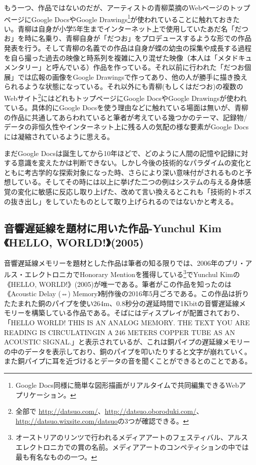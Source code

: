 \documentclass[a4paper,report]{jsbook}
\begin{document}
もう一つ、作品ではないのだが、アーティストの青柳菜摘のWebページのトップページにGoogle
DocsやGoogle Drawings\footnote{Google
  Docs同様に簡単な図形描画がリアルタイムで共同編集できるWebアプリケーション。}が使われていることに触れておきたい。青柳は自身が小学5年生までインターネット上で使用していたあだ名「だつお」を時に名乗り、青柳自身が「だつお」をプロデュースするような形での作品発表を行う。そして青柳の名義での作品は自身が蝶の幼虫の採集や成長する過程を自ら撮った過去の映像と時系列を複雑に入り混ぜた映像（本人は「メタドキュメンタリー」と呼んでいる）作品を作っている\autocite{aoyagi:icc}。それ以前に行われた「だつお個展」では広報の画像をGoogle
Drawingsで作ってあり、他の人が勝手に描き換えられるような状態になっている\autocite{datsuo:koten}。それ以外にも青柳(もしくはだつお)の複数のWebサイト\footnote{全部で
  \url{http://datsuo.com/}、\url{http://datsuo.oboroduki.com/}、\url{http://datsuo.wixsite.com/datsuo}の3つが確認できる。}にはどれもトップページにGoogle
DocsやGoogle Drawingsが使われている。具体的にGoogle
Docsを使う理由などに触れている場面は無いが、青柳の作品に共通してあらわれていると筆者が考えている幾つかのテーマ、記録物/データの非恒久性やインターネット上に残る人の気配の様な要素がGoogle
Docsには凝縮されているように思える。

まだGoogle
Docsは誕生してから10年ほどで、どのように人間の記憶や記録に対する意識を変えたかは判断できない。しかし今後の技術的なパラダイムの変化とともに考古学的な探索対象になった時、さらにより深い意味付がされるものと予想している。そしてその時には以上に挙げた二つの例はシステムの与える身体感覚の変化に敏感に反応し取り上げた、改めて言い換えるとこれも「技術的トポスの抜き出し」をしていたものとして取り上げられるのではないかと考える。

\subsection{音響遅延線を題材に用いた作品-Yunchul Kim《HELLO,
WORLD!》(2005)}\label{ux97f3ux97ffux9045ux5ef6ux7ddaux3092ux984cux6750ux306bux7528ux3044ux305fux4f5cux54c1-yunchul-kimhello-world2005}

音響遅延線メモリーを題材とした作品は筆者の知る限りでは、2006年のプリ・アルス・エレクトロニカでHonorary
Mentionを獲得している\footnote{オーストリアのリンツで行われるメディアアートのフェスティバル、アルスエレクトロニカでの賞の名前。メディアアートのコンペティションの中では最も有名なものの一つ。}でYunchul
Kimの《HELLO,
WORLD!》(2005)が唯一である。筆者がこの作品を知ったのは《Acoustic Delay
(⇔)
Memory》制作後の2016年5月ごろである。この作品は折りたたまれた銅のパイプを使い264m、0.8秒分の遅延時間で1Kbitの音響遅延線メモリーを構築している作品である。そばにはディスプレイが配置されており、「HELLO
WORLD! THIS IS AN ANALOG MEMORY. THE TEXT YOU ARE READING IS
CIRCULATINGIN A 246 METERS COPPER TUBE AS AN ACOUSTIC
SIGNAL.」と表示されているが、これは銅パイプの遅延線メモリーの中のデータを表示しており、銅のパイプを叩いたりすると文字が崩れていく。また銅パイプに耳を近づけるとデータの音を聞くことができるとのことである。
\end{document}
